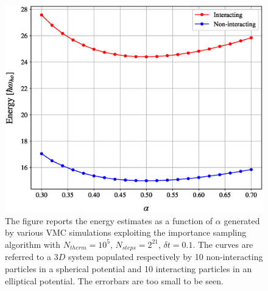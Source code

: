 {\begin{figure}[h!]
    \includegraphics[scale=0.37]{images/varying_alpha_comparison_interacting_and_not.eps}
    \caption{The figure reports the energy estimates as a function of $\alpha$ generated by various VMC simulations exploiting the importance sampling algorithm with $N_{therm}=10^5$, $N_{steps}=2^{21}$, $\delta t = 0.1$. The curves are referred to a $3D$ system populated respectively by 10 non-interacting particles in a spherical potential and 10 interacting particles in an elliptical potential. The errorbars are too small to be seen. }
    \label{fig:asymm_symm_comparison}
\end{figure}
}

